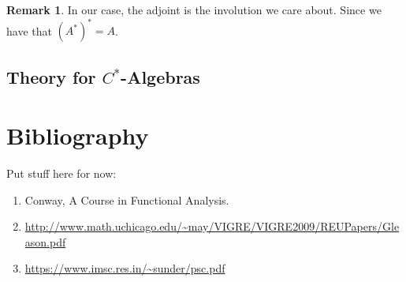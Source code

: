 \documentclass[leqno]{article}
\theoremstyle{definition}
\newtheorem*{remark}{Remark}
\theoremstyle{remark}
\theoremstyle{theorem}
\begin{document}
\begin{remark}
In our case, the adjoint is the involution we care about.  Since we have that $(A^*)^*=A$.
\end{remark}


\subsection{Theory for $C^*$-Algebras}


\pagebreak
\section{Bibliography}
Put stuff here for now:

\begin{enumerate}[1.]
\item Conway, A Course in Functional Analysis.
\item \url{http://www.math.uchicago.edu/~may/VIGRE/VIGRE2009/REUPapers/Gleason.pdf}\\
\item \url{https://www.imsc.res.in/~sunder/psc.pdf}
\end{enumerate}
\end{document}
